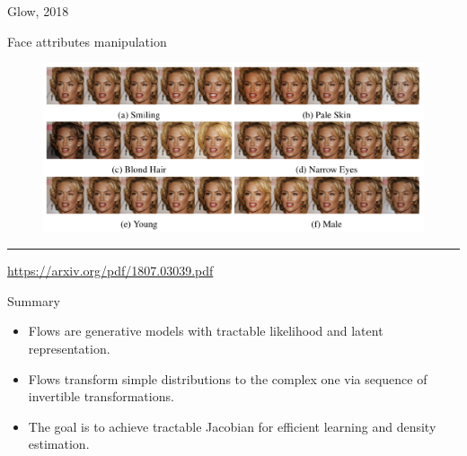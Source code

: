 \documentclass{beamer}
\begin{document}
\begin{frame}{Glow, 2018}
	\begin{block}{Face attributes manipulation}
		\begin{figure}
			\centering
			\includegraphics[width=\linewidth]{figs/glow_attributes.png}
		\end{figure}
	\end{block}
	\vfill
	\hrule\medskip
	{\scriptsize \href{https://arxiv.org/pdf/1807.03039.pdf}{https://arxiv.org/pdf/1807.03039.pdf}}   
\end{frame}
\begin{frame}{Summary}
	\begin{itemize}
		\item Flows are generative models with tractable likelihood and latent representation.
		\item Flows transform simple distributions to the complex one via sequence of invertible transformations.
		\item The goal is to achieve tractable Jacobian for efficient learning and density estimation.
	\end{itemize}
\end{frame}
\end{document}
